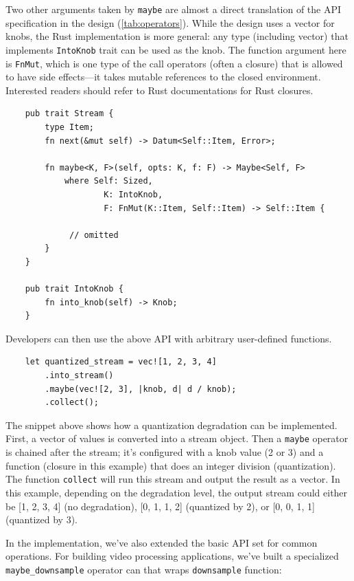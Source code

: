 Two other arguments taken by \texttt{maybe} are almost a direct translation of
the API specification in the design (\autoref{tab:operators}). While the design
uses a vector for knobs, the Rust implementation is more general: any type
(including vector) that implements \texttt{IntoKnob} trait can be used as the
knob. The function argument here is \texttt{FnMut}, which is one type of the
call operators (often a closure) that is allowed to have side effects---it takes
mutable references to the closed environment. Interested readers should refer to
Rust documentations for Rust closures.

\begin{lstlisting}
    pub trait Stream {
        type Item;
        fn next(&mut self) -> Datum<Self::Item, Error>;

        fn maybe<K, F>(self, opts: K, f: F) -> Maybe<Self, F>
            where Self: Sized,
                    K: IntoKnob,
                    F: FnMut(K::Item, Self::Item) -> Self::Item {

             // omitted
        }
    }

    pub trait IntoKnob {
        fn into_knob(self) -> Knob;
    }
\end{lstlisting}

Developers can then use the above API with arbitrary user-defined functions.

\begin{lstlisting}
    let quantized_stream = vec![1, 2, 3, 4]
        .into_stream()
        .maybe(vec![2, 3], |knob, d| d / knob);
        .collect();
\end{lstlisting}

The snippet above shows how a quantization degradation can be
implemented. First, a vector of values is converted into a stream object. Then a
\texttt{maybe} operator is chained after the stream; it's configured with a knob
value (2 or 3) and a function (closure in this example) that does an integer
division (quantization). The function \texttt{collect} will run this stream and
output the result as a vector. In this example, depending on the degradation
level, the output stream could either be [1, 2, 3, 4] (no degradation), [0, 1,
1, 2] (quantized by 2), or [0, 0, 1, 1] (quantized by 3).

In the implementation, we've also extended the basic API set for common
operations. For building video processing applications, we've built a
specialized \texttt{maybe\_downsample} operator can that wraps
\texttt{downsample} function:

